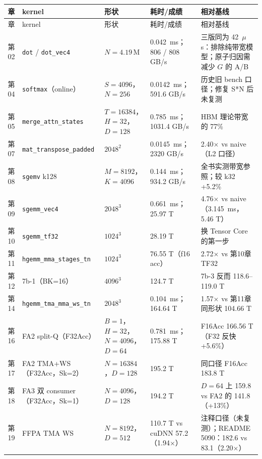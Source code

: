 \begingroup\small
\begin{longtable}{cp{4.3cm}p{2.9cm}p{2.7cm}p{3.4cm}}
\toprule
章 & kernel & 形状 & 耗时/成绩 & 相对基线 \\
\midrule
\endfirsthead
\toprule
章 & kernel & 形状 & 耗时/成绩 & 相对基线 \\
\midrule
\endhead
\endfoot
\bottomrule
\endlastfoot
第02 & \texttt{dot} / \texttt{dot\_vec4} & $N{=}4.19\,$M & 0.042~ms；806 / 808 GB/s & 三版同为 42~$\mu$s：排除纯带宽模型；原子归因需减少 $G$ 的 A/B \\
第04 & \texttt{softmax}（online） & $S{=}4096$，$N{=}256$ & 0.0142~ms；591.6 GB/s & 历史旧 bench 口径；修复 S*N 后未复测 \\
第05 & \texttt{merge\_\allowbreak{}attn\_\allowbreak{}states} & $T{=}16384$，$H{=}32$，$D{=}128$ & 0.785~ms；1031.4 GB/s & HBM 理论带宽的 77\% \\
第07 & \texttt{mat\_\allowbreak{}transpose\_\allowbreak{}padded} & $2048^2$ & 0.0145~ms；2320 GB/s & 2.40$\times$ vs naive（L2 口径） \\
第08 & \texttt{sgemv} k128 & $M{=}8192$，$K{=}4096$ & 0.144~ms；934.2 GB/s & 全书实测带宽参照；较 k32 +5.2\% \\
第09 & \texttt{sgemm\_vec4} & $2048^3$ & 0.661~ms；25.97 T & 4.76$\times$ vs naive（3.145~ms，5.46 T） \\
第10 & \texttt{sgemm\_tf32} & $1024^3$ & 28.19 T & 换 Tensor Core 的第一步 \\
第11 & \texttt{hgemm\_\allowbreak{}mma\_\allowbreak{}stages\_\allowbreak{}tn} & $1024^3$ & 76.55 T（f16 acc） & 2.72$\times$ vs 第10章 TF32 \\
第12 & 7b-1（BK=16） & $4096^3$ & 124.7 T & 7b-3 反而 118.6--119.0 T \\
第14 & \texttt{hgemm\_\allowbreak{}tma\_\allowbreak{}mma\_\allowbreak{}ws\_\allowbreak{}tn} & $2048^3$ & 0.104~ms；164.64 T & 1.57$\times$ vs 第11章同形状 104.66 T \\
第16 & FA2 split-Q（F32Acc） & $B{=}1$，$H{=}32$，$N{=}4096$，$D{=}64$ & 0.781~ms；175.88 T & F16Acc 166.56 T（F32 反快 +5.6\%） \\
第17 & FA2 TMA+WS（F32Acc，Sk=2） & $N{=}16384$，$D{=}128$ & 195.2 T & 同口径 F16Acc 183.8 T \\
第18 & FA3 双 consumer（F32Acc，Sk=1） & $N{=}4096$，$D{=}128$ & 194.2 T & $D{=}64$ 上 159.8 vs FA2 的 141.8（+13\%） \\
第19 & FFPA TMA WS & $N{=}8192$，$D{=}512$ & 110.7 T vs cuDNN 57.2（1.94$\times$） & 注释口径（未复测）；README 5090：182.6 vs 83.1（2.20$\times$） \\
\end{longtable}
\endgroup

